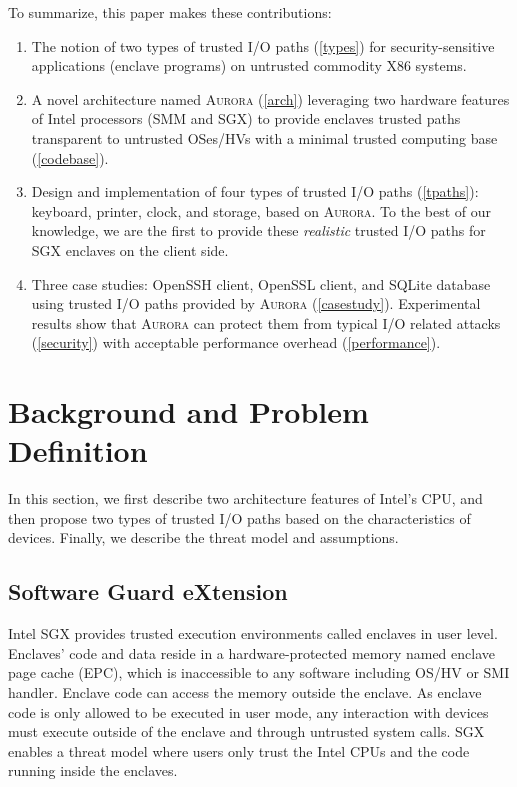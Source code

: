 To summarize, this paper makes these contributions:
\begin{enumerate}[]
\item The notion of two types of trusted I/O paths (\autoref{types}) for security-sensitive applications (enclave programs) on untrusted commodity X86 systems.
\item A novel architecture named \textsc{Aurora} (\autoref{arch}) leveraging two hardware features of Intel processors (SMM and SGX) to provide enclaves trusted paths transparent to untrusted OSes/HVs with a minimal trusted computing base (\autoref{codebase}).
\item Design and implementation of four types of trusted I/O paths (\autoref{tpaths}): keyboard, printer, clock, and storage, based on \textsc{Aurora}.  To the best of our knowledge, we are the first to provide these \emph{realistic} trusted I/O paths for SGX enclaves on the client side.
\item Three case studies: OpenSSH client, OpenSSL client, and SQLite database using trusted I/O paths provided by \textsc{Aurora} (\autoref{casestudy}). Experimental results show that \textsc{Aurora} can protect them from typical I/O related attacks (\autoref{security}) with acceptable performance overhead (\autoref{performance}).
\end{enumerate}

\section{Background and Problem Definition}
In this section, we first describe two architecture features of Intel's CPU, and then propose two types of trusted I/O paths based on the characteristics of devices. Finally, we describe the threat model and assumptions.

\subsection{Software Guard eXtension}
Intel SGX \cite{DBLP:conf/isca/McKeenABRSSS13} provides trusted execution environments called enclaves in user level. Enclaves' code and data reside in a hardware-protected memory named enclave page cache (EPC), which is inaccessible to any software including OS/HV or SMI handler. Enclave code can access the memory outside the enclave. As enclave code is only allowed to be executed in user mode, any interaction with devices must execute outside of the enclave and through untrusted system calls. SGX enables a threat model where users only trust the Intel CPUs and the code running inside the enclaves.

